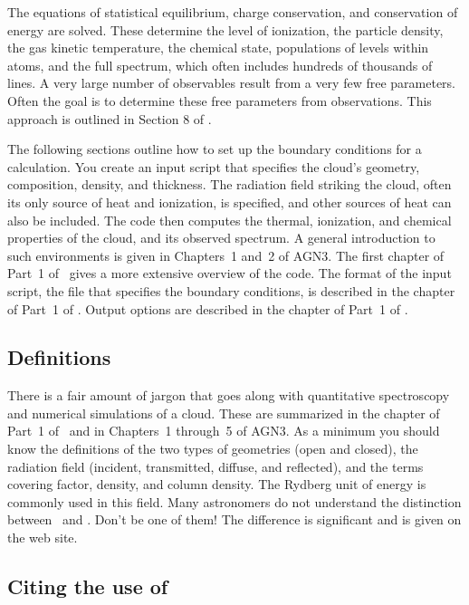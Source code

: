 \documentclass[12pt,twoside]{article}
\begin{document}
{The equations of statistical equilibrium, charge conservation, and
conservation of energy are solved.  These determine the level of ionization,
the particle density, the gas kinetic temperature, the chemical state,
populations of levels within atoms, and the full spectrum, which often
includes hundreds of thousands of lines.  A very large number of observables
result from a very few free parameters.  Often the goal is to determine these
free parameters from observations.  This approach is outlined in Section
8 of \citet{Ferland03}.

The following sections outline how to set up the boundary conditions
for a calculation.  You create an input script that specifies the cloud's
geometry, composition, density, and thickness.  The radiation field striking
the cloud, often its only source of heat and ionization, is specified, and
other sources of heat can also be included.  The code then computes the
thermal, ionization, and chemical properties of the cloud, and its observed
spectrum.  A general introduction to such environments is given in
Chapters~1 and~2 of AGN3.  The first chapter
of Part~1 of \Hazy\ gives a more extensive
overview of the code.
The format of the input script, the file that
specifies the boundary conditions, is described in the chapter
 of Part~1 of \Hazy.
Output options are described in the
chapter  of Part~1 of \Hazy.

\subsection{Definitions}

There is a fair amount of jargon that goes along with quantitative
spectroscopy and numerical simulations of a cloud.  These are summarized
in the chapter  of Part~1 of \Hazy\ and in Chapters~1 through~5
of AGN3.  As a minimum you should know the definitions of the two types of
geometries (open and closed), the radiation field (incident, transmitted, diffuse,
and reflected), and the terms covering factor, density, and column density.
The Rydberg unit of energy is commonly used in this field.
Many astronomers do not understand the distinction between
\hO\ and \hi .
Don't be one of them!  The difference is significant and is given
on the web site.

\subsection{Citing the use of \Cloudy}

}
\end{document}
